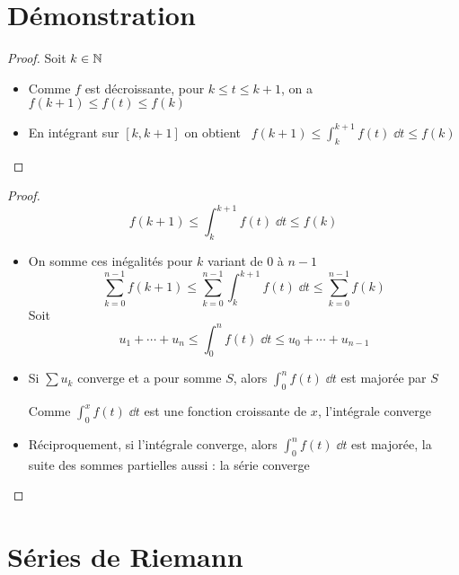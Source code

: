 \section{Démonstration}

\begin{frame}
\begin{proof}
Soit $k\in\mathbb{N}$

\begin{itemize}
\item\pause Comme $f$ est décroissante, pour $k\le t \le k+1$, on a $f(k+1)\le f(t)\le f(k)$
\item\pause En intégrant sur $[k,k+1]$ on obtient \ \pause $f(k+1)\le \displaystyle\int_k^{k+1} f(t) \; \dd t \le f(k)$
\noqed\qedhere
\end{itemize}
\end{proof}
\end{frame}


\begin{frame}
\begin{proof}
$$f(k+1)\le \int_k^{k+1} f(t) \; \dd t \le f(k)$$
\begin{itemize}
\item\pause On somme ces inégalités pour $k$ variant de $0$ à $n-1$
\pause
$$\sum_{k=0}^{n-1} f(k+1) \le \sum_{k=0}^{n-1} \int_{k}^{k+1} f(t) \; \dd t
\le \sum_{k=0}^{n-1} f(k)
$$
\pause
Soit
$$u_1+\cdots+u_{n} \le \int_0^{n} f(t)\; \dd t \le u_0+\cdots+u_{n-1}$$

\item\pause Si $\sum u_k$ converge et a pour somme $S$\pause , alors $\int_0^{n} f(t)\; \dd t$ est
majorée par $S$

\pause
Comme $\int_0^x f(t)\; \dd t$ est une fonction croissante de $x$, l'intégrale converge 

\item\pause Réciproquement, si l'intégrale
converge, alors $\int_0^{n} f(t)\;\dd t$ est majorée\pause , la suite des
sommes partielles aussi : la série converge \qedhere
\end{itemize}
\end{proof}
\end{frame}


\section{Séries de Riemann}

